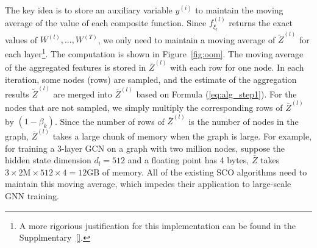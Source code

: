 The key idea is to store an auxiliary variable $y^{(i)}$ to maintain the moving average of the value of each composite function. 
Since $f^{(l)}_{\xi_l}$ returns the exact values of $W^{(l)}, ..., W^{(T)}$, we only need to maintain a moving average of $\widetilde{Z}^{(l)}$ for each layer\footnote{A more rigorious justification for this implementation can be found in the Supplmentary~\ref{}.}. 
The computation is shown in Figure~\ref{fig:oom}. 
The moving average of the aggregated features is stored in $\bar{Z}^{(l)}$ with each row for one node. 
In each iteration, some nodes (rows) are sampled, and the estimate of the aggregation results $\widetilde{Z}^{(l)}$ are merged into $\bar{Z}^{(l)}$ based on Formula (\ref{eq:alg_step1}). 
For the nodes that are not sampled, we simply multiply the corresponding rows of  $\bar{Z}^{(l)}$ by $(1-\beta_k)$. 
Since the number of rows of $\bar{Z}^{(l)}$ is the number of nodes in the graph, $\bar{Z}^{(l)}$ takes a large chunk of memory when the graph is large. 
For example, for training a 3-layer GCN on a graph with two million nodes, suppose the hidden state dimension $d_l=512$ and a floating point has 4 bytes, $\bar{Z}$ takes $3\times 2\text{M} \times 512 \times 4=12$GB of memory. 
All of the existing SCO algorithms need to maintain this moving average, which impedes their application to large-scale GNN training. 








